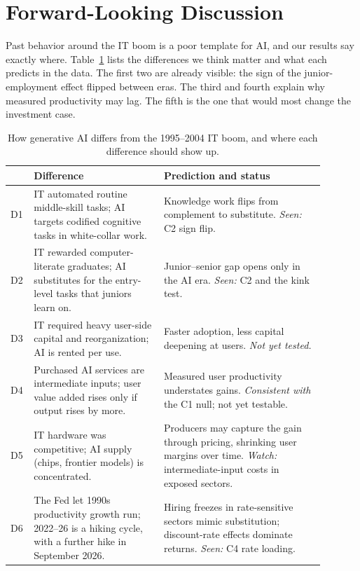 \section{Forward-Looking Discussion}
\label{sec:forward}

Past behavior around the IT boom is a poor template for AI, and our results say exactly where. Table~\ref{tab:diffs} lists the differences we think matter and what each predicts in the data. The first two are already visible: the sign of the junior-employment effect flipped between eras. The third and fourth explain why measured productivity may lag. The fifth is the one that would most change the investment case.

\begin{table}[t]
\caption{How generative AI differs from the 1995--2004 IT boom, and where each difference should show up.}
\label{tab:diffs}
\begin{singlespace}\small\centering
\begin{tabular}{p{0.04\linewidth}p{0.38\linewidth}p{0.47\linewidth}}
\toprule
 & Difference & Prediction and status \\
\midrule
D1 & IT automated routine middle-skill tasks; AI targets codified cognitive tasks in white-collar work. & Knowledge work flips from complement to substitute. \emph{Seen:} C2 sign flip. \\
D2 & IT rewarded computer-literate graduates; AI substitutes for the entry-level tasks that juniors learn on. & Junior--senior gap opens only in the AI era. \emph{Seen:} C2 and the kink test. \\
D3 & IT required heavy user-side capital and reorganization; AI is rented per use. & Faster adoption, less capital deepening at users. \emph{Not yet tested.} \\
D4 & Purchased AI services are intermediate inputs; user value added rises only if output rises by more. & Measured user productivity understates gains. \emph{Consistent with} the C1 null; not yet testable. \\
D5 & IT hardware was competitive; AI supply (chips, frontier models) is concentrated. & Producers may capture the gain through pricing, shrinking user margins over time. \emph{Watch:} intermediate-input costs in exposed sectors. \\
D6 & The Fed let 1990s productivity growth run; 2022--26 is a hiking cycle, with a further hike in September 2026. & Hiring freezes in rate-sensitive sectors mimic substitution; discount-rate effects dominate returns. \emph{Seen:} C4 rate loading. \\
\bottomrule
\end{tabular}
\end{singlespace}
\end{table}

